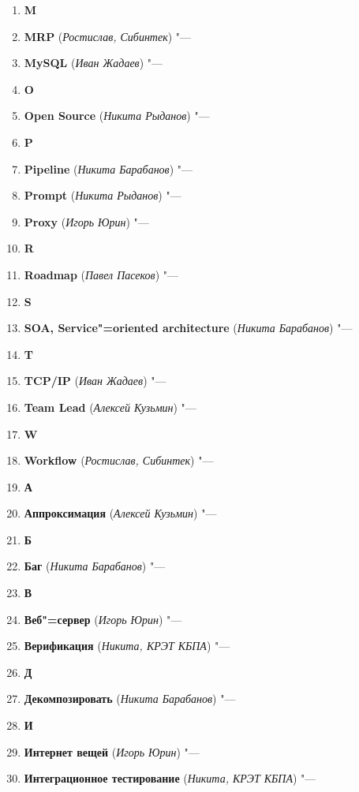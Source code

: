 \documentclass[a4paper, 14 pt]{extarticle}
\begin{document}
\begin{enumerate}
    \item[] \textbf{M}
    \item \textbf{MRP} (\textit{Ростислав, Сибинтек}) "--- 
    \item \textbf{MySQL} (\textit{Иван Жадаев}) "--- 
    \item[] \textbf{O}
    \item \textbf{Open Source} (\textit{Никита Рыданов}) "--- 
    \item[] \textbf{P}
    \item \textbf{Pipeline} (\textit{Никита Барабанов}) "--- 
    \item \textbf{Prompt} (\textit{Никита Рыданов}) "---
    \item \textbf{Proxy} (\textit{Игорь Юрин}) "--- 
    \item[] \textbf{R}
    \item \textbf{Roadmap} (\textit{Павел Пасеков}) "--- 
    \item[] \textbf{S}
    \item \textbf{SOA, Service"=oriented architecture} 
    (\textit{Никита Барабанов}) "---  
    \item[] \textbf{T}
    \item \textbf{TCP/IP} (\textit{Иван Жадаев}) "--- 
    \item \textbf{Team Lead} (\textit{Алексей Кузьмин}) "--- 
    \item[] \textbf{W}
    \item \textbf{Workflow} (\textit{Ростислав, Сибинтек}) "--- 
    \item[] \textbf{А}
    \item \textbf{Аппроксимация} (\textit{Алексей Кузьмин}) "--- 
    \item[] \textbf{Б} 
    \item \textbf{Баг} (\textit{Никита Барабанов}) "--- 
    \item[] \textbf{В} 
    \item \textbf{Веб"=сервер} (\textit{Игорь Юрин}) "--- 
    \item \textbf{Верификация} (\textit{Никита, КРЭТ КБПА}) "--- 
    \item[] \textbf{Д} 
    \item \textbf{Декомпозировать} (\textit{Никита Барабанов}) "--- 
    \item[] \textbf{И} 
    \item \textbf{Интернет вещей} (\textit{Игорь Юрин}) "--- 
    \item \textbf{Интеграционное тестирование} (\textit{Никита, КРЭТ КБПА}) "---

\end{enumerate}
\end{document}
